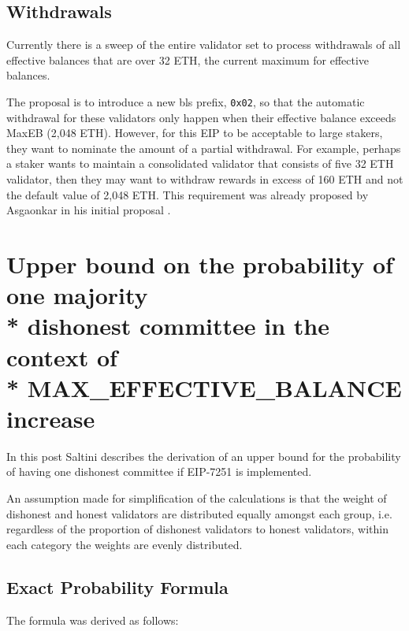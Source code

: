 \documentclass[UTF8]{article}
\begin{document}
\subsection{Withdrawals}
Currently there is a sweep of the entire validator set to process withdrawals of all effective balances that are over 32 ETH, the current maximum for effective balances. 

The proposal is to introduce a new \gls{bls} prefix, \texttt{0x02}, so that the automatic withdrawal for these validators only happen when their effective balance exceeds MaxEB (2,048 ETH). However, for this EIP to be acceptable to large stakers, they want to nominate the amount of a partial withdrawal. For example, perhaps a staker wants to maintain a consolidated validator that consists of five 32 ETH validator, then they may want to withdraw rewards in excess of 160 ETH and not the default value of 2,048 ETH. This requirement was already proposed by Asgaonkar in his initial proposal \cite{Asgaonkar2023}.

\section{Upper bound on the probability of one majority \\* dishonest committee in the context of \\* MAX\_EFFECTIVE\_BALANCE increase}

In this post Saltini describes the derivation of an upper bound for the probability of having one dishonest committee if EIP-7251 is implemented.

An assumption made for simplification of the calculations is that the weight of dishonest and honest validators are distributed equally amongst each group, i.e. regardless of the proportion of dishonest validators to honest validators, within each category the weights are evenly distributed.

\subsection{Exact Probability Formula}
The formula was derived as follows:
\end{document}
